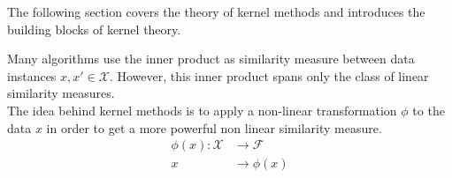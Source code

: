 The following section covers the theory of kernel methods and introduces the building blocks of kernel theory.


Many algorithms use the inner product as similarity measure between data instances $x, x' \in \mathcal{X}$. However, this inner product spans only the class of linear similarity measures. 
\\
The idea behind kernel methods is to apply a non-linear transformation $\phi$ to the data $x$ 
in order to get a more powerful non linear similarity measure.
\begin{align*}
\phi(x)\colon \mathcal{X} &\to \mathcal{F}
    \\
    x&\to \phi(x)
\end{align*}


